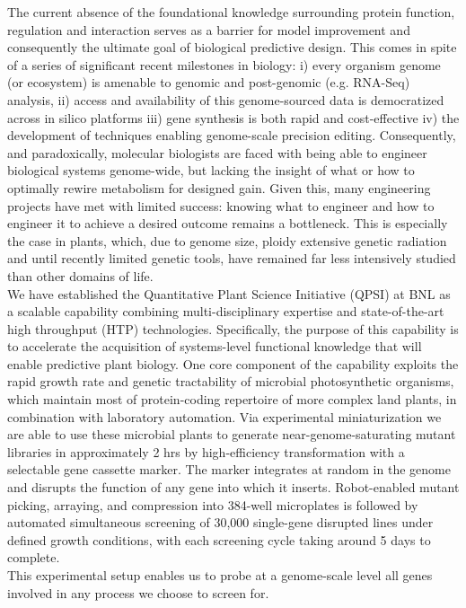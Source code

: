 \documentclass[11pt]{article}
\begin{document}
The current absence of the foundational knowledge surrounding protein function, regulation and interaction serves as a barrier for model improvement and consequently the ultimate goal of biological predictive design. This comes in spite of a series of significant recent milestones in biology: i) every organism genome (or ecosystem) is amenable to genomic and post-genomic (e.g. RNA-Seq) analysis, ii) access and availability of this genome-sourced data is democratized across in silico platforms iii) gene synthesis is both rapid and cost-effective iv) the development of techniques enabling genome-scale precision editing. Consequently, and paradoxically, molecular biologists are faced with being able to engineer biological systems genome-wide, but lacking the insight of what or how to optimally rewire metabolism for designed gain. Given this, many engineering projects have met with limited success: knowing what to engineer and how to engineer it to achieve a desired outcome remains a bottleneck. This is especially the case in plants, which, due to genome size, ploidy extensive genetic radiation and until recently limited genetic tools, have remained far less intensively studied than other domains of life.
\\
We have established the Quantitative Plant Science Initiative (QPSI) at BNL as a scalable capability combining multi-disciplinary expertise and state-of-the-art high throughput (HTP) technologies. Specifically, the purpose of this capability is to accelerate the acquisition of systems-level functional knowledge that will enable predictive plant biology. One core component of the capability exploits the rapid growth rate and genetic tractability of microbial photosynthetic organisms, which maintain most of protein-coding repertoire of more complex land plants, in combination with laboratory automation. Via experimental miniaturization we are able to use these microbial plants to generate near-genome-saturating mutant libraries in approximately 2 hrs by high-efficiency transformation with a selectable gene cassette marker. The marker integrates at random in the genome and disrupts the function of any gene into which it inserts. Robot-enabled mutant picking, arraying, and compression into 384-well microplates is followed by automated simultaneous screening of 30,000 single-gene disrupted lines under defined growth conditions, with each screening cycle taking around 5 days to complete. 
\\
This experimental setup enables us to probe at a genome-scale level all genes involved in any process we choose to screen for.
\end{document}
